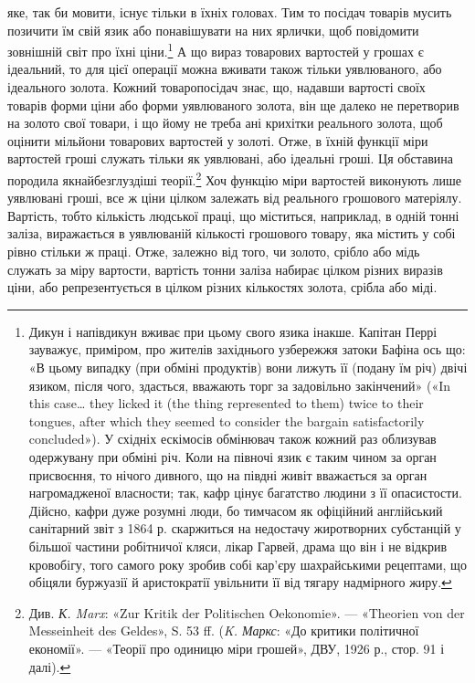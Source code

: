 \parcont{}  %
яке, так би мовити, існує тільки в їхніх головах. Тим то посідач
товарів мусить позичити їм свій язик або понавішувати на них
ярлички, щоб повідомити зовнішній світ про їхні ціни.\footnote{
Дикун і напівдикун вживає при цьому свого язика інакше. Капітан
Перрі зауважує, приміром, про жителів західнього узбережжя затоки
Бафіна ось що: «В цьому випадку (при обміні продуктів) вони лижуть
її (подану їм річ) двічі язиком, після чого, здасться, вважають торг за задовільно
закінчений» («In this case\dots{} they licked it (the thing represented
to them) twice to their tongues, after which they seemed to consider
the bargain satisfactorily concluded»). У східніх ескімосів обмінювач
також кожний раз облизував одержувану при обміні річ. Коли на півночі
язик є таким чином за орган присвоєння, то нічого дивного, що на
півдні живіт вважається за орган нагромадженої власности; так, кафр
цінує багатство людини з її опасистости. Дійсно, кафри дуже розумні
люди, бо тимчасом як офіційний англійський санітарний звіт з 1864 р.
скаржиться на недостачу жиротворних субстанцій у більшої частини робітничої
кляси, лікар Гарвей, драма що він і не відкрив кровобігу, того
самого року зробив собі кар’єру шахрайськими рецептами, що обіцяли
буржуазії й аристократії увільнити її від тягару надмірного жиру.
} А що
вираз товарових вартостей у грошах є ідеальний, то для цієї
операції можна вживати також тільки уявлюваного, або ідеального
золота. Кожний товаропосідач знає, що, надавши вартості
своїх товарів форми ціни або форми уявлюваного золота, він
ще далеко не перетворив на золото свої товари, і що йому не
треба ані крихітки реального золота, щоб оцінити мільйони
товарових вартостей у золоті. Отже, в їхній функції міри вартостей
гроші служать тільки як уявлювані, або ідеальні гроші.
Ця обставина породила якнайбезглуздіші теорії.\footnote{
Див. \emph{К. Marx}: «Zur Kritik der Politischen Oekonomie». — «Theorien
von der Messeinheit des Geldes», S. 53 ff. (\emph{K. Маркс}: «До критики
політичної економії». — «Теорії про одиницю міри грошей», ДВУ, 1926 р.,
стор. 91 і далі).
} Хоч функцію
міри вартостей виконують лише уявлювані гроші, все ж ціни
цілком залежать від реального грошового матеріялу. Вартість,
тобто кількість людської праці, що міститься, наприклад, в
одній тонні заліза, виражається в уявлюваній кількості грошового
товару, яка містить у собі рівно стільки ж праці. Отже,
залежно від того, чи золото, срібло або мідь служать за міру
вартости, вартість тонни заліза набирає цілком різних виразів
ціни, або репрезентується в цілком різних кількостях золота,
срібла або міді.

